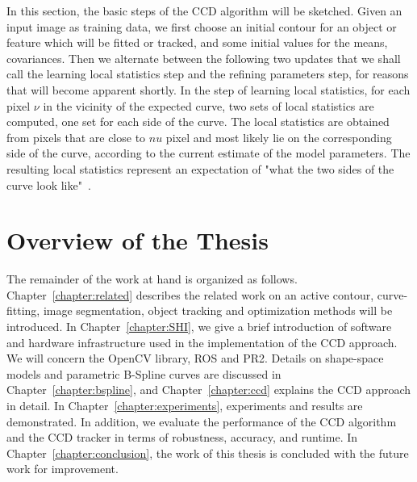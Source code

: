In this section, the basic steps of the CCD algorithm will be
sketched. Given an input image as training data, we first choose an initial
contour for an object or feature which will be fitted or tracked, and
some initial values for the means, covariances. Then we alternate
between the following two updates that we shall call the learning
local statistics step and the refining parameters step, for reasons
that will become apparent shortly.
In the step of learning local statistics, for each pixel $\nu$ in the
vicinity of the expected curve, two sets of local statistics
are computed, one set for each side of the curve. The local statistics are obtained from
pixels that are close to $nu$ pixel and most likely lie on the corresponding side of the curve,
according to the current estimate of the model parameters. The resulting local statistics
represent an expectation of "what the two sides of the curve look
like"~\cite{hanek2004contracting}.



\section{Overview of the Thesis}
\label{sec:overview}
The remainder of the work at hand is organized as
follows. Chapter~\ref{chapter:related} describes the related work on
an active contour,
curve-fitting, image segmentation, object tracking and optimization methods will be
introduced. In Chapter~\ref{chapter:SHI}, we give a brief introduction of software
and hardware infrastructure used in the implementation of the CCD
approach. We will concern the OpenCV library, ROS and PR2. Details on shape-space models and parametric
B-Spline curves are discussed in Chapter~\ref{chapter:bspline},  and
Chapter~\ref{chapter:ccd} explains the CCD approach in detail. 
In Chapter~\ref{chapter:experiments}, experiments and results are demonstrated. In
addition, we evaluate the performance of the CCD algorithm and the CCD
tracker in terms of robustness, accuracy, and runtime. In Chapter~\ref{chapter:conclusion},
the work of this thesis is concluded with the future work for improvement.



